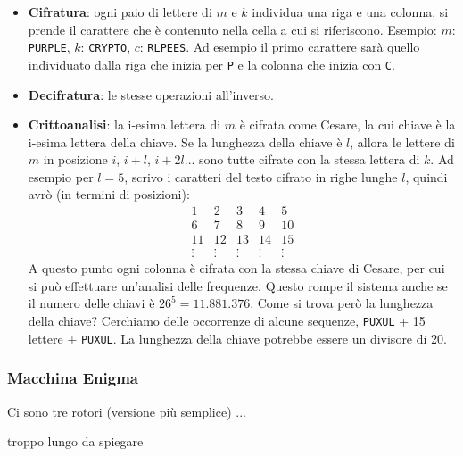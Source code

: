 \begin{itemize}
	\item \textbf{Cifratura}: ogni paio di lettere di $m$ e $k$ individua una riga e una colonna, si prende il carattere che è contenuto nella cella a cui si riferiscono.
	Esempio: $m$: \texttt{PURPLE}, $k$: \texttt{CRYPTO}, $c$: \texttt{RLPEES}.
	Ad esempio il primo carattere sarà quello individuato dalla riga che inizia per \texttt{P} e la colonna che inizia con \texttt{C}.
	\item \textbf{Decifratura}: le stesse operazioni all'inverso.
	\item \textbf{Crittoanalisi}: la i-esima lettera di $m$ è cifrata come Cesare, la cui chiave è la i-esima lettera della chiave. Se la lunghezza della chiave è $l$, allora le lettere di $m$ in posizione $i$, $i+l$, $i+2l$... sono tutte cifrate con la stessa lettera di $k$.
	Ad esempio per $l = 5$, scrivo i caratteri del testo cifrato in righe lunghe $l$, quindi avrò (in termini di posizioni):
	\begin{equation*}
	\begin{matrix}
	1 & 2 & 3 & 4 & 5\\
	6 & 7 & 8 & 9 & 10\\
	11 & 12 & 13 & 14 & 15\\
	\vdots & \vdots & \vdots & \vdots & \vdots
	\end{matrix}
	\end{equation*}
	A questo punto ogni colonna è cifrata con la stessa chiave di Cesare, per cui si può effettuare un'analisi delle frequenze.
	Questo rompe il sistema anche se il numero delle chiavi è $26^5 = 11.881.376$.
	Come si trova però la lunghezza della chiave? Cerchiamo delle occorrenze di alcune sequenze, \texttt{PUXUL} + 15 lettere + \texttt{PUXUL}. La lunghezza della chiave potrebbe essere un divisore di 20.
\end{itemize}

\subsubsection*{Macchina Enigma}
Ci sono tre rotori (versione più semplice) ...

troppo lungo da spiegare 

